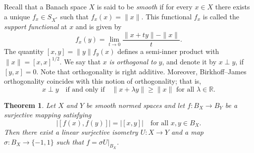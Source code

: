 \documentclass{memo-l}
\newtheorem{thm}[theorem]{Theorem}
\theoremstyle{definition}
\theoremstyle{remark}
\numberwithin{section}{chapter}
\numberwithin{equation}{chapter}
\newcommand\R{\ensuremath{\mathbb{R}}}
\begin{document}
Recall that a Banach space $X$ is said to be \emph{smooth} if for
every $x \in X$ there exists a unique $f_x \in S_{X^{*}}$ such that
$f_x(x)=\|x\|$. This functional $f_x$ is called the \emph{support
functional} at $x$ and is given by
\[
f_x(y)=\lim_{t\to 0}\frac{\|x+ty\|-\|x\|}{t}.
\]
The quantity $[x,y]=\|y\|f_y(x)$ defines a semi-inner product with
$\|x\|=[x,x]^{1/2}$. We say that $x$ \emph{is orthogonal to} $y$, and
denote it by $x\perp y$, if $[y,x]=0$. Note that orthogonality is right
additive. Moreover, Birkhoff--James orthogonality coincides with this
notion of orthogonality; that is,
\[
x\perp y\quad\text{if and only if}\quad\|x+\lambda y\|\ge \|x\|\text{ for
all }\lambda \in \R.
\]

\begin{thm}\label{thm:wigner}
    Let $X$ and $Y$ be smooth normed spaces and
    let $f\colon B_X\to B_Y$ be a surjective mapping satisfying
    \[
        |[f(x),f(y)]|=|[x,y]|\quad\text{for all }x,y \in B_X.
    \]
    Then there exist a linear surjective isometry $U\colon X\to Y$
    and a map $\sigma \colon B_X\to \{-1,1\}$ such that $f=\sigma
    U|_{B_X}$.
\end{thm}
\end{document}
